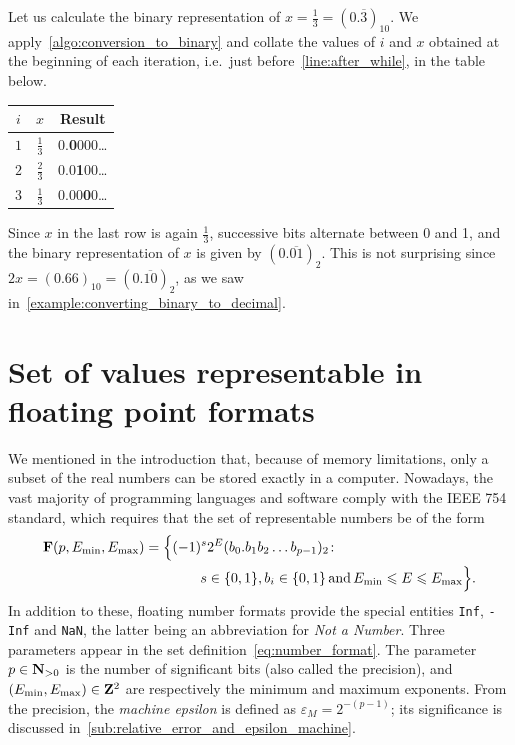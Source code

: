 \begin{example}
    Let us calculate the binary representation of $x = \frac{1}{3} = (0.\overline{3})_{10}$.
    We apply~\cref{algo:conversion_to_binary} and collate the values of $i$ and $x$ obtained at the beginning of each iteration,
    i.e.\ just before~\cref{line:after_while}, in the table below.
    \begin{center}
    \begin{tabular}{|c|c|c|}
        \hline
        $i$ & $x$ & Result \\ \hline
        $1$ & $\frac{1}{3}$ & 0.\textbf{0}000\dots \\ \hline
        $2$ & $\frac{2}{3}$ & 0.0\textbf{1}00\dots \\ \hline
        $3$ & $\frac{1}{3}$ & 0.00\textbf{0}0\dots \\ \hline
    \end{tabular}
    \end{center}
    Since $x$ in the last row is again $\frac{1}{3}$,
    successive bits alternate between 0 and 1,
    and the binary representation of $x$ is given by $(0.\overline{01})_2$.
    This is not surprising since $2x = (0.66)_{10} = (0.\overline{10})_2$,
    as we saw in~\cref{example:converting_binary_to_decimal}.
\end{example}



\section{Set of values representable in floating point formats}%
\label{sec:set_of_values}
We mentioned in the introduction that,
because of memory limitations,
only a subset of the real numbers can be stored exactly in a computer.
Nowadays, the vast majority of programming languages and software comply with the IEEE 754 standard,
which requires that the set of representable numbers be of the form
\begin{align}
    \notag
    \floating (p, E_{\min}, E_{\max})
    = \Bigl\{ & (-1)^s 2^E (b_0. b_1 b_2 \dots b_{p-1})_2 \colon \\
    \label{eq:number_format}%
              & \qquad s \in \{0, 1\}, b_i \in \{0, 1\} \, \text{and} \, E_{\min} \leq E \leq E_{\max} \Bigr\}.
\end{align}
In addition to these, floating number formats provide the special entities \texttt{Inf}, \texttt{-Inf} and \texttt{NaN},
the latter being an abbreviation for \emph{Not a Number}.
Three parameters appear in the set definition~\eqref{eq:number_format}.
The parameter $p \in \mathbf N_{>0}$ is the number of significant bits (also called the precision),
and $(E_{\min}, E_{\max}) \in \mathbf Z^2$ are respectively the minimum and maximum exponents.
From the precision, the \emph{machine epsilon} is defined as $\varepsilon_{M} = 2^{-(p-1)}$;
its significance is discussed in~\cref{sub:relative_error_and_epsilon_machine}.

